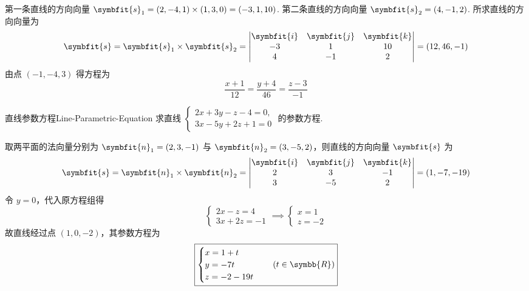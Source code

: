 \begin{solution}
    第一条直线的方向向量 $\symbfit{s}_1 = (2, -4, 1) \times (1, 3, 0) = (-3, 1, 10)$. 第二条直线的方向向量 $\symbfit{s}_2 = (4, -1, 2)$.
    所求直线的方向向量为
    \begin{equation*}
        \symbfit{s} = \symbfit{s}_1 \times \symbfit{s}_2 =
        \begin{vmatrix}
            \symbfit{i} & \symbfit{j} & \symbfit{k} \\
            -3          & 1           & 10          \\
            4           & -1          & 2
        \end{vmatrix} = (12, 46, -1)
    \end{equation*}
    由点 $(-1, -4, 3)$ 得方程为
    \begin{equation*}
        \boxed{\frac{x+1}{12} = \frac{y+4}{46} = \frac{z-3}{-1}}
    \end{equation*}
\end{solution}


\begin{problem}{直线参数方程}{Line-Parametric-Equation}
    求直线 $\begin{cases} 2x + 3y - z - 4 = 0, \\ 3x - 5y + 2z + 1 = 0 \end{cases}$ 的参数方程.
\end{problem}

\begin{solution}
    取两平面的法向量分别为 $\symbfit{n}_1 = (2, 3, -1)$ 与 $\symbfit{n}_2 = (3, -5, 2)$，则直线的方向向量 $\symbfit{s}$ 为
    \begin{equation*}
        \symbfit{s} = \symbfit{n}_1 \times \symbfit{n}_2 = \begin{vmatrix} \symbfit{i} & \symbfit{j} & \symbfit{k} \\ 2 & 3 & -1 \\ 3 & -5 & 2 \end{vmatrix} = (1, -7, -19)
    \end{equation*}
    令 $y = 0$，代入原方程组得
    \begin{equation*}
        \begin{cases} 2x - z = 4 \\ 3x + 2z = -1 \end{cases} \implies \begin{cases} x = 1 \\ z = -2 \end{cases}
    \end{equation*}
    故直线经过点 $(1, 0, -2)$，其参数方程为
    \begin{equation*}
        \boxed{\begin{cases} x = 1 + t \\ y = -7t \\ z = -2 - 19t \end{cases} \quad (t \in \symbb{R})}
    \end{equation*}
\end{solution}

